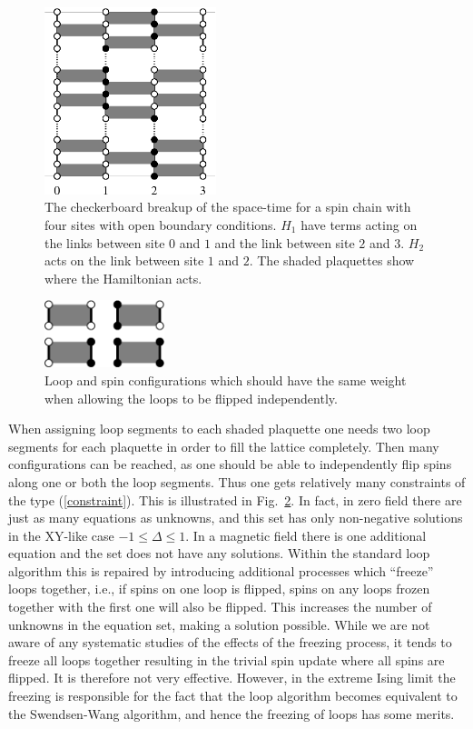 \documentclass[10pt,pre,aps,twocolumn,showpacs,superscriptaddress,
floatfix]{revtex4}
\begin{document}
\begin{figure}
\includegraphics[clip,width=5cm]{fig10.eps}
\caption{The checkerboard breakup of the space-time for a spin chain with four
sites with open boundary conditions. $H_1$ have terms acting  on the links 
between site $0$ and $1$ and the link between site $2$ and $3$. $H_2$ acts 
on the link between site $1$ and $2$. The shaded plaquettes show where the 
Hamiltonian acts.
\label{Checkerboard}} 
\end{figure}

\begin{figure}
\includegraphics[clip,width=3.5cm]{fig11.eps}
\caption{Loop and spin configurations which should have the same weight when 
allowing the loops to be flipped independently.
\label{PIMconstraints}}
\end{figure}

When assigning loop segments to each shaded plaquette one needs two
loop segments for each plaquette in order to fill the lattice completely.
Then many configurations can be reached, as one should be able
to independently flip spins along one or both the loop segments. Thus
one gets relatively many constraints of the type (\ref{constraint}). This is 
illustrated in Fig.~\ref{PIMconstraints}. In fact, in zero field there are 
just as many equations as unknowns, and this set has only non-negative 
solutions in the XY-like case $-1 \leq \Delta \leq 1$. In a magnetic field 
there is one additional equation and the set does not have any solutions. 
Within the standard loop algorithm this is repaired by introducing additional 
processes which ``freeze'' loops together, i.e., if spins on one loop is 
flipped, spins on any loops frozen together with the first one will also be 
flipped. This increases the number of unknowns in the equation set, making a 
solution possible. While we are not aware of any systematic studies of the 
effects of the freezing process, it tends to freeze all loops together 
resulting in the trivial spin update where all spins are flipped. It is 
therefore not very effective. However, in the extreme Ising limit the 
freezing is responsible for the fact that the loop algorithm becomes
equivalent to the Swendsen-Wang algorithm, 
and hence the freezing of loops has some merits.
\end{document}
